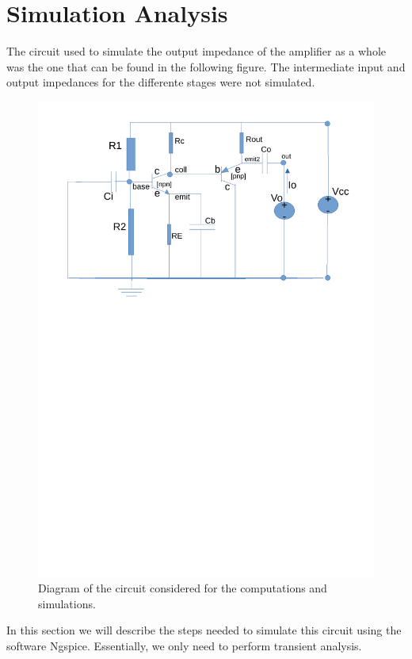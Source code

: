 \section{Simulation Analysis}
\label{sec:simulation}

The circuit used to simulate the output impedance of the amplifier as a whole was the one that can be found in the following figure. The intermediate input and output impedances for the differente stages were not simulated.

\begin{figure}[H] \centering
\includegraphics[width=0.95\linewidth]{diagram_t4_zout.pdf}
\vspace{-6cm}
\caption{Diagram of the circuit considered for the computations and simulations.}
\label{fig:diagram_t4_zout}
\end{figure}

In this section we will describe the steps needed to simulate this circuit using the software Ngspice. Essentially, we only need to perform transient analysis.

